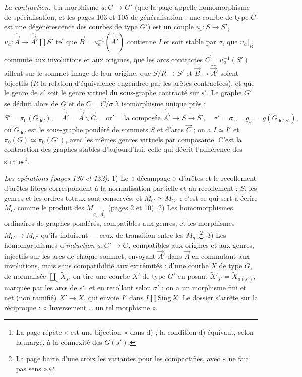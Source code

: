\documentclass[11pt,a4paper]{article}
\begin{document}
\emph{La contraction.} Un morphisme $u : G \to G'$ (que la page appelle
homomorphisme de spécialisation, et les pages 103 et 105 de généralisation :
une courbe de type $G$ est une dégénérescence des courbes de type $G'$) est un
couple $u_s : S \to S'$, $u_a : \hat{\vec A} \to \hat{\vec A}' \amalg S'$ tel
que $\vec B = u_a^{-1}(\hat{\vec A}')$ contienne $I$ et soit stable par
$\sigma$, que $u_a|_{\vec B}$ commute aux involutions et aux origines, que les
arcs contractés $\vec C = u_a^{-1}(S')$ aillent sur le sommet image de leur
origine, que $S/R \to S'$ et $\vec B \to \hat{\vec A}'$ soient bijectifs ($R$
la relation d'équivalence engendrée par les arêtes contractées), et que le
genre de $s'$ soit le genre virtuel du sous-graphe contracté sur $s'$. Le
graphe $G'$ se déduit alors de $G$ et de $C = \vec C/\sigma$ à isomorphisme
unique près :
\[
S' = \pi_0(G_{0C}), \quad \hat{\vec A}' = \hat{\vec A} \smallsetminus \vec C,
\quad \mathrm{or}' = \text{la composée } \hat{\vec A}' \to S \to S', \quad
\sigma' = \sigma|, \quad g_{s'} = g(G_{0C,s'}),
\]
où $G_{0C}$ est le sous-graphe pondéré de sommets $S$ et d'arcs $\vec C$ ; on
a $I \simeq I'$ et $\pi_0(G) \simeq \pi_0(G')$, avec les mêmes genres
virtuels par composante. C'est la contraction des graphes stables
d'aujourd'hui, celle qui décrit l'adhérence des strates\footnote{La page
répète « est une bijection » dans d) ; la condition d) équivaut, selon la
marge, à la connexité des $G(s')$.}.

\emph{Les opérations (pages 130 et 132).} 1) Le « décampage » d'arêtes et le
recollement d'arêtes libres correspondent à la normalisation partielle et au
recollement ; $S$, les genres et les ordres totaux sont conservés, et $M_G
\simeq M_{G'}$ : c'est ce qui sert à écrire $M_G$ comme le produit des
$M_{g_s, \hat{\vec A}_s}$ (pages 2 et 10). 2) Les homomorphismes ordinaires de
graphes pondérés, compatibles aux genres, et les morphismes $M_G \to M_{G'}$
qu'ils induisent — ceux de transition entre les $M_{g,\nu}$\footnote{La page
barre d'une croix les variantes pour les compactifiés, avec « ne fait pas
sens ».}. 3) Les homomorphismes d'\emph{induction} $u : G' \to G$, compatibles
aux origines et aux genres, injectifs sur les arcs de chaque sommet, envoyant
$\vec A'$ dans $\vec A$ en commutant aux involutions, mais sans
compatibilité aux extrémités : d'une courbe $X$ de type $G$, de normalisée
$\coprod_s \widetilde{X}_s$, on tire une courbe $X'$ de type $G'$ en posant
$\widetilde{X}'_{s'} = \widetilde{X}_{u(s')}$, marquée par les arcs de $s'$, et en
recollant selon $\sigma'$ ; on a un morphisme fini et net (non ramifié) $X'
\to X$, qui envoie $I'$ dans $I \amalg \mathrm{Sing}\,X$. Le dossier s'arrête
sur la réciproque : « Inversement \ldots{} un tel morphisme ».
\end{document}
